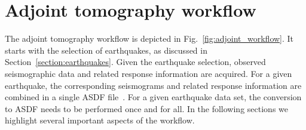 \documentclass[extra,mreferee]{gji}
\begin{document}


\section{Adjoint tomography workflow}
\label{section:workflow}

The adjoint tomography workflow is depicted in Fig.~\ref{fig:adjoint_workflow}.
It starts with the selection of earthquakes, as discussed in Section~\ref{section:earthquakes}.
Given the earthquake selection,
observed seismographic data and related response information are acquired.
For a given earthquake,
the corresponding seismograms and related response information are combined in a single ASDF file~\citep{krischer2016adaptable}.
For a given earthquake data set, the conversion to ASDF needs to be performed once and for all.
In the following sections we highlight several important aspects of the workflow.
\end{document}
